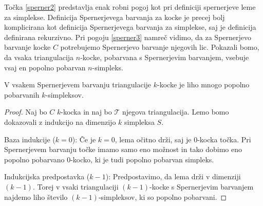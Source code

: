 \documentclass[mat1]{fmfdelo}
\newcommand{\0}{0}
\newcommand{\pT}{\mathcal T}
\begin{document}
Točka \eqref{sperner2} predstavlja enak robni pogoj kot pri definiciji spernerjeve leme za simplekse.
Definicija Spernerjevega barvanja za kocke je precej bolj komplicirana kot definicija Spernerjevega barvanja za simplekse, saj je definicija \label{def:cubsperner} definirana rekurzivno. Pri pogoju \eqref{sperner3} namreč vidimo, da za Spernerjevo barvanje kocke $C$ potrebujemo Spernerjevo barvanje njegovih lic.
Pokazali bomo, da vsaka triangulacija $n$-kocke, pobarvana s Spernerjevim barvanjem, vsebuje vsaj en popolno pobarvan $n$-simpleks.
\begin{lema}\label{izr:kubsperner}
V vsakem Spernerjevem barvanju triangulacije $k$-kocke je liho mnogo popolno pobarvanih $k$-simpleksov.
\end{lema}
\begin{proof}
Naj bo $C$ $k$-kocka in naj bo $\pT$ njegova triangulacija. Lemo bomo dokazovali z indukcijo na dimenzijo $k$ simpleksa $S$.

Baza indukcije ($k = 0$):
Če je $k = 0$, lema očitno drži, saj je $0$-kocka točka. Pri Spernerjevem barvanju točke imamo samo eno možnost in tako dobimo eno popolno pobarvano $0$-kocko, ki je tudi popolno pobarvan simpleks.

Indukcijska predpostavka ($k - 1$):
Predpostavimo, da lema drži v dimenziji $(k - 1)$. Torej v vsaki triangulaciji $(k - 1)$-kocke s Spernerjevim barvanjem najdemo liho število $(k - 1)$-simpleksov, ki so popolno pobarvani.


\end{proof}
\end{document}
